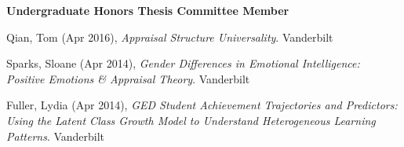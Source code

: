 {\large\textbf{Undergraduate Honors Thesis Committee Member}}
\begin{etaremune}
\item Qian, Tom (Apr 2016), \textit{Appraisal Structure Universality}. Vanderbilt%
%
\item Sparks, Sloane (Apr 2014), \textit{Gender Differences in Emotional Intelligence: Positive Emotions \& Appraisal Theory}. Vanderbilt%
\item Fuller, Lydia (Apr 2014), \textit{GED Student Achievement Trajectories and Predictors: Using the Latent Class Growth Model to Understand Heterogeneous Learning Patterns}. Vanderbilt%
\end{etaremune}
